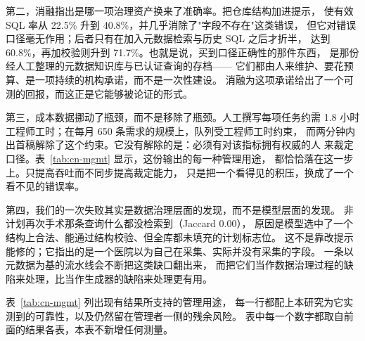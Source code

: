 \documentclass[11pt,a4paper]{article}
\begin{document}
第二，消融指出是哪一项治理资产换来了准确率。把仓库结构加进提示，
使有效 SQL 率从 22.5\% 升到 40.8\%，并几乎消除了"字段不存在"这类错误，
但它对错误口径毫无作用；后者只有在加入元数据检索与历史 SQL 之后才折半，
达到 60.8\%，再加校验则升到 71.7\%。也就是说，买到口径正确性的那件东西，
是那份经人工整理的元数据知识库与已认证查询的存档——
它们都由人来维护、要花预算、是一项持续的机构承诺，而不是一次性建设。
消融为这项承诺给出了一个可测的回报，而这正是它能够被论证的形式。

第三，成本数据挪动了瓶颈，而不是移除了瓶颈。人工撰写每项任务约需 1.8 小时
工程师工时；在每月 650 条需求的规模上，队列受工程师工时约束，
而两分钟内出首稿解除了这个约束。它没有解除的是：必须有对该指标拥有权威的人
来裁定口径。表~\ref{tab:cn-mgmt} 显示，这份输出的每一种管理用途，
都恰恰落在这一步上。只提高吞吐而不同步提高裁定能力，
只是把一个看得见的积压，换成了一个看不见的错误率。

第四，我们的一次失败其实是数据治理层面的发现，而不是模型层面的发现。
非计划再次手术那条查询什么都没检索到（Jaccard 0.00），
原因是模型选中了一个结构上合法、能通过结构校验、但全库都未填充的计划标志位。
这不是靠改提示能修的；它指出的是一个医院以为自己在采集、实际并没有采集的字段。
一条以元数据为基的流水线会不断把这类缺口翻出来，
而把它们当作数据治理过程的缺陷来处理，比当作生成器的缺陷来处理更有用。

表~\ref{tab:cn-mgmt} 列出现有结果所支持的管理用途，
每一行都配上本研究为它实测到的可靠性，以及仍然留在管理者一侧的残余风险。
表中每一个数字都取自前面的结果各表，本表不新增任何测量。
\end{document}

